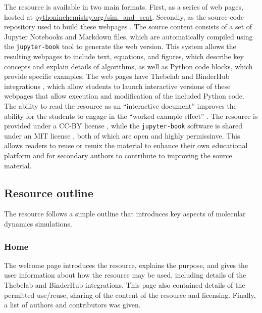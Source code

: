 The resource is available in two main formats.
First, as a series of web pages, hosted at \href{https://pythoninchemistry.org/sim_and_scat}{pythoninchemistry.org/sim\_and\_scat}.
Secondly, as the source-code repository used to build these webpages \cite{mccluskey_pythoninchemistry/sim_and_scat_2019}.
The source content consists of a set of Jupyter Notebooks and Markdown files, which are automatically compiled using the \texttt{jupyter-book} tool \cite{lau_jupyter/jupyter-book_2019} to generate the web version.
This system allows the resulting webpages to include text, equations, and figures, which describe key concepts and explain details of algorithms, as well as Python code blocks, which provide specific examples.
The web pages have Thebelab and BinderHub integrations \cite{ragan-kelley_minrk/thebelab_2019, ragan-kelley_jupyterhub/binderhub_2019, jupyter_binder_2018}, which allow students to launch interactive versions of these webpages that allow execution and modification of the included Python code.
The ability to read the resource as an ``interactive document'' improves the ability for the students to engage in the ``worked example effect'' \cite{tarmizi_guidance_1988}.
The resource is provided under a CC-BY license \cite{creative_commons_creative_2019}, while the \texttt{jupyter-book} software is shared under an MIT license \cite{open_source_mit_2019}, both of which are open and highly permissinve.
This allows readers to reuse or remix the material to enhance their own educational platform and for secondary authors to contribute to improving the source material.

\subsection{Resource outline}

The resource follows a simple outline that introduces key aspects of molecular dynamics simulations.

\subsubsection{Home}

The welcome page introduces the resource, explains the purpose, and gives the user information about how the resource may be used, including details of the Thebelab and BinderHub integrations.
This page also contained details of the permitted use/reuse, sharing of the content of the resource and licensing.
Finally, a list of authors and contributors was given.

